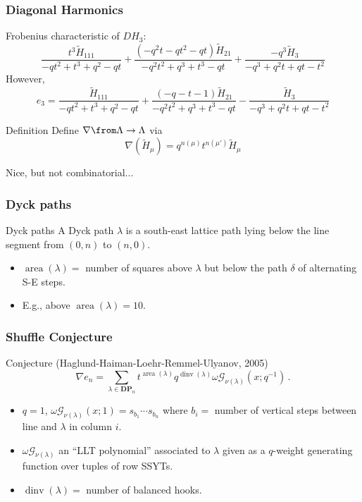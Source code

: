 \documentclass{beamer}
\newcommand{\sym}{\Lambda}
\DeclareMathOperator{\area}{area}
\DeclareMathOperator{\dinv}{dinv}
\newcommand{\DP}{\mathbf{DP}}
\newcommand{\Gcal}{\mathcal{G}}
\begin{document}
\begin{frame}
  \frametitle{Diagonal Harmonics}
  Frobenius characteristic of \(DH_3\):\pause
  \[
\frac{t^{3}\tilde{H}_{111}}{-q t^{2} + t^{3} + q^{2} - q
    t} + \frac{(-q^{2} t - q t^{2} - q t) \tilde{H}_{21}}{-q^{2} t^{2} + q^{3} + t^{3} - q t} + \frac{-q^{3}\tilde{H}_{3}}{-q^{3} + q^{2} t + q t - t^{2}}
  \]\pause
  However, \[
e_3 = \frac{\tilde{H}_{111}}{-q t^{2} + t^{3} + q^{2} - q t} + \frac{(-q - t - 1)\tilde{H}_{21}}{-q^{2} t^{2} + q^{3} + t^{3} - q t} - \frac{\tilde{H}_3}{-q^{3} + q^{2} t + q t - t^{2}}
  \]\pause
  \begin{block}{Definition}
    Define \(\nabla \from \sym \to \sym\) via \[
      \nabla(\tilde{H}_\mu) = q^{n(\mu)} t^{n(\mu')} \tilde{H}_\mu
    \]
  \end{block}
  Nice, but not combinatorial...
\end{frame}
\begin{frame}
  \frametitle{Dyck paths}
  \begin{block}{Dyck paths}
    A Dyck path \(\lambda\) is a south-east lattice path lying below
    the line segment from \((0,n)\) to \((n,0)\).
  \end{block}
  \begin{center}
  \end{center}\pause
  \begin{itemize}
  \item \(\area(\lambda) = \) number of squares above \(\lambda\) but
    below the path \(\delta\) of alternating S-E steps. \pause
  \item E.g., above \(\area(\lambda) = 10\).
  \end{itemize}
\end{frame}
\begin{frame}
  \frametitle{Shuffle Conjecture}
  \begin{block}{Conjecture (Haglund-Haiman-Loehr-Remmel-Ulyanov, 2005)}
    \[
      \nabla e_n = \sum_{\lambda \in \DP_n} t^{\area(\lambda)}
      q^{\dinv(\lambda)}\omega\Gcal_{\nu(\lambda)}(x;q^{-1}) \,.
    \]
  \end{block}\pause
  \begin{itemize}
  \item \(q=1\), \(\omega\Gcal_{\nu(\lambda)}(x;1) = s_{b_1} \cdots s_{b_n}\)
    where \(b_i =\) number of vertical steps between line and
    \(\lambda\) in column \(i\).\pause
  \item \(\omega\Gcal_{\nu(\lambda)}\) an ``LLT polynomial'' associated to
    \(\lambda\) given as a \(q\)-weight generating function over
    tuples of row SSYTs.\pause
  \item \(\dinv(\lambda) =\) number of balanced hooks.
  \end{itemize}
\end{frame}
\end{document}

